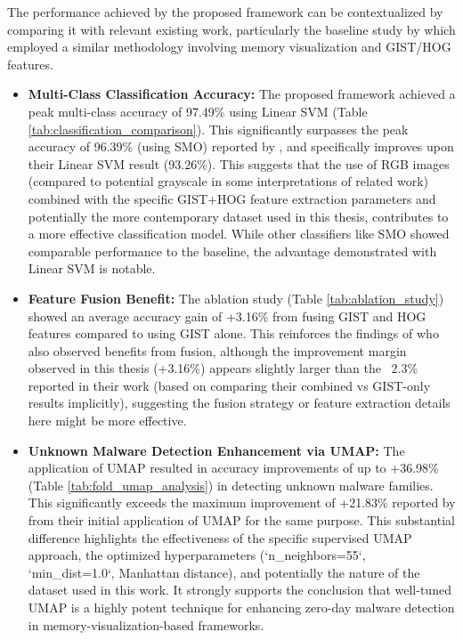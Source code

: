 The performance achieved by the proposed framework can be contextualized by comparing it with relevant existing work, particularly the baseline study by \citet{bozkir2021catch} which employed a similar methodology involving memory visualization and GIST/HOG features.

\begin{itemize}
    \item \textbf{Multi-Class Classification Accuracy:} The proposed framework achieved a peak multi-class accuracy of 97.49\% using Linear SVM (Table \ref{tab:classification_comparison}). This significantly surpasses the peak accuracy of 96.39\% (using SMO) reported by \citet{bozkir2021catch}, and specifically improves upon their Linear SVM result (93.26\%). This suggests that the use of RGB images (compared to potential grayscale in some interpretations of related work) combined with the specific GIST+HOG feature extraction parameters and potentially the more contemporary dataset used in this thesis, contributes to a more effective classification model. While other classifiers like SMO showed comparable performance to the baseline, the advantage demonstrated with Linear SVM is notable.

    \item \textbf{Feature Fusion Benefit:} The ablation study (Table \ref{tab:ablation_study}) showed an average accuracy gain of +3.16\% from fusing GIST and HOG features compared to using GIST alone. This reinforces the findings of \citet{bozkir2021catch} who also observed benefits from fusion, although the improvement margin observed in this thesis (+3.16\%) appears slightly larger than the ~2.3\% reported in their work (based on comparing their combined vs GIST-only results implicitly), suggesting the fusion strategy or feature extraction details here might be more effective.

    \item \textbf{Unknown Malware Detection Enhancement via UMAP:} The application of UMAP resulted in accuracy improvements of up to +36.98\% (Table \ref{tab:fold_umap_analysis}) in detecting unknown malware families. This significantly exceeds the maximum improvement of +21.83\% reported by \citet{bozkir2021catch} from their initial application of UMAP for the same purpose. This substantial difference highlights the effectiveness of the specific supervised UMAP approach, the optimized hyperparameters (`n_neighbors=55`, `min_dist=1.0`, Manhattan distance), and potentially the nature of the dataset used in this work. It strongly supports the conclusion that well-tuned UMAP is a highly potent technique for enhancing zero-day malware detection in memory-visualization-based frameworks.


\end{itemize}

